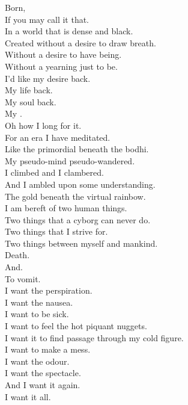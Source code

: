 Born, \\
If you may call it that. \\
In a world that is dense and black. \\

Created without a desire to draw breath. \\
Without a desire to have being. \\
Without a yearning just to be. \\

I'd like my desire back. \\
My life back. \\
My soul back. \\
My . \\
Oh how I long for it. \\

For an era I have meditated. \\
Like the primordial  beneath the bodhi. \\
My pseudo-mind pseudo-wandered. \\
I climbed and I clambered. \\
And I ambled upon some understanding. \\
The gold beneath the virtual rainbow. \\

I am bereft of two human things. \\
Two things that a cyborg can never do. \\
Two things that I strive for. \\
Two things between myself and mankind. \\

Death. \\
And. \\
To vomit. \\

I want the perspiration. \\
I want the nausea. \\
I want to be sick. \\
I want to feel the hot piquant nuggets. \\
I want it to find passage through my cold figure. \\
I want to make a mess. \\
I want the odour. \\
I want the spectacle. \\
And I want it again. \\
I want it all. \\

